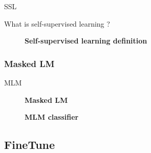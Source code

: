 \documentclass[10pt]{beamer}
\begin{document}
  \begin{frame}{SSL}

    What is self-supervised learning ?
    \begin{figure}
      \centering
      \caption{\textbf{Self-supervised learning definition} }
    \end{figure}

  \end{frame}

  \subsubsection*{Masked LM}
  \begin{frame}{MLM}
    \begin{figure}
      \centering
      \caption{\textbf{Masked LM} }
    \end{figure}
    \begin{figure}
      \centering
      \caption{\textbf{MLM classifier} }
    \end{figure}
  \end{frame}

  \subsection{FineTune}
\end{document}
